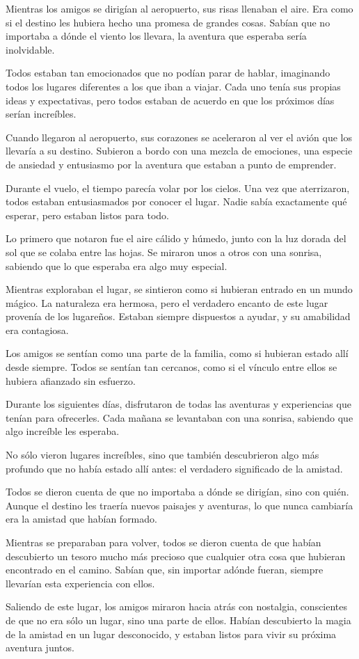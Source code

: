 

Mientras los amigos se dirigían al aeropuerto, sus risas llenaban el aire. Era como si el destino les hubiera hecho una promesa de grandes cosas. Sabían que no importaba a dónde el viento los llevara, la aventura que esperaba sería inolvidable.

Todos estaban tan emocionados que no podían parar de hablar, imaginando todos los lugares diferentes a los que iban a viajar. Cada uno tenía sus propias ideas y expectativas, pero todos estaban de acuerdo en que los próximos días serían increíbles.

Cuando llegaron al aeropuerto, sus corazones se aceleraron al ver el avión que los llevaría a su destino. Subieron a bordo con una mezcla de emociones, una especie de ansiedad y entusiasmo por la aventura que estaban a punto de emprender.

Durante el vuelo, el tiempo parecía volar por los cielos. Una vez que aterrizaron, todos estaban entusiasmados por conocer el lugar. Nadie sabía exactamente qué esperar, pero estaban listos para todo.

Lo primero que notaron fue el aire cálido y húmedo, junto con la luz dorada del sol que se colaba entre las hojas. Se miraron unos a otros con una sonrisa, sabiendo que lo que esperaba era algo muy especial.

Mientras exploraban el lugar, se sintieron como si hubieran entrado en un mundo mágico. La naturaleza era hermosa, pero el verdadero encanto de este lugar provenía de los lugareños. Estaban siempre dispuestos a ayudar, y su amabilidad era contagiosa.

Los amigos se sentían como una parte de la familia, como si hubieran estado allí desde siempre. Todos se sentían tan cercanos, como si el vínculo entre ellos se hubiera afianzado sin esfuerzo.

Durante los siguientes días, disfrutaron de todas las aventuras y experiencias que tenían para ofrecerles. Cada mañana se levantaban con una sonrisa, sabiendo que algo increíble les esperaba.

No sólo vieron lugares increíbles, sino que también descubrieron algo más profundo que no había estado allí antes: el verdadero significado de la amistad.

Todos se dieron cuenta de que no importaba a dónde se dirigían, sino con quién. Aunque el destino les traería nuevos paisajes y aventuras, lo que nunca cambiaría era la amistad que habían formado.

Mientras se preparaban para volver, todos se dieron cuenta de que habían descubierto un tesoro mucho más precioso que cualquier otra cosa que hubieran encontrado en el camino. Sabían que, sin importar adónde fueran, siempre llevarían esta experiencia con ellos.

Saliendo de este lugar, los amigos miraron hacia atrás con nostalgia, conscientes de que no era sólo un lugar, sino una parte de ellos. Habían descubierto la magia de la amistad en un lugar desconocido, y estaban listos para vivir su próxima aventura juntos.
